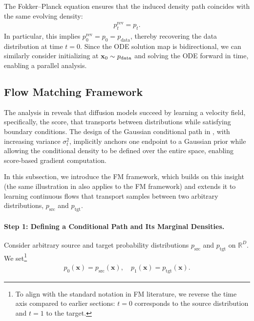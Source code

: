 The Fokker–Planck equation ensures that the induced density path coincides with the same evolving density:
\begin{align}\label{eq:p_t-fwd-rev}
p_t^{\mathrm{rev}} = p_t.
\end{align}
In particular, this implies $p_0^{\mathrm{rev}} = p_0 = p_{\text{data}}$, thereby recovering the data distribution at time $t=0$. Since the ODE solution map is bidirectional, we can similarly consider initializing at 
${\mathbf{x}}_0 \sim p_{\text{data}}$ and solving the ODE forward in time, enabling a parallel analysis.


\subsection{Flow Matching Framework}\label{subsec:fm-framework}

The analysis in  reveals that diffusion models succeed by learning a velocity field, specifically, the score, that transports between distributions while satisfying boundary conditions. The design of the Gaussian conditional path in , with increasing variance $\sigma_t^2$, implicitly anchors one endpoint to a Gaussian prior while allowing the conditional density to be defined over the entire space, enabling score-based gradient computation.

In this subsection, we introduce the FM framework, which builds on this insight 
(the same illustration in  also applies to the FM framework) 
and extends it to learning continuous flows that transport samples between two arbitrary 
distributions, $p_{\text{src}}$ and $p_{\text{tgt}}$.





\paragraph{Step 1: Defining a Conditional Path and Its Marginal Densities.}
Consider arbitrary source and target probability distributions $ p_{\mathrm{src}} $ and $ p_{\mathrm{tgt}} $ on $\mathbb{R}^D$. We set\footnote{To align with the standard notation in FM literature, we reverse the time axis compared to earlier sections: $t=0$ corresponds to the source distribution and $t=1$ to the target.}
\begin{align}\label{eq:marginal-endpoint}
    p_0(\mathbf{x}) = p_{\mathrm{src}}(\mathbf{x}), \quad p_1(\mathbf{x}) = p_{\mathrm{tgt}}(\mathbf{x}).
\end{align}

